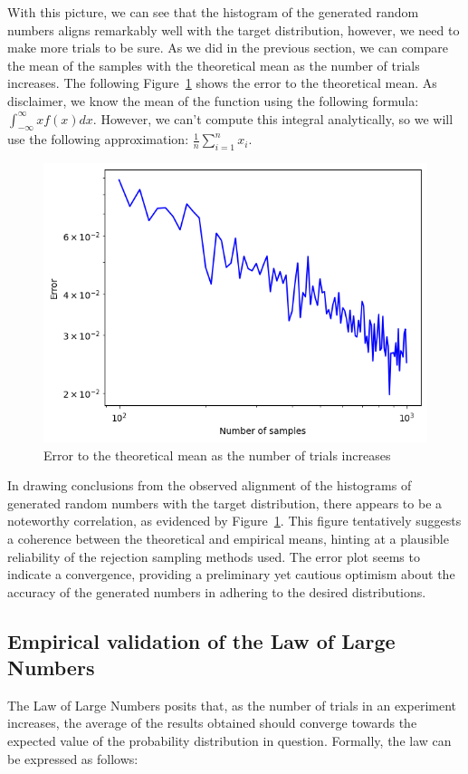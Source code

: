 \documentclass{article}
\begin{document}
With this picture, we can see that the histogram of the generated random numbers aligns remarkably well with the target distribution, however, we need to make more trials to be sure. As we did in the previous section, we can compare the mean of the samples with the theoretical mean as the number of trials increases. The following Figure~\ref{fig:rejectionerror} shows the error to the theoretical mean. As disclaimer, we know the mean of the function using the following formula: \(\int_{-\infty}^{\infty} xf(x)dx\). However, we can't compute this integral analytically, so we will use the following approximation: \(\frac{1}{n}\sum_{i=1}^{n} x_i\).

\begin{figure}[H]
	\centering
	\includegraphics[width=0.5\linewidth]{./Figures/AcceptanceRejection/error_linear_regression.png}
	\caption{Error to the theoretical mean as the number of trials increases}
	\label{fig:rejectionerror}
\end{figure}

In drawing conclusions from the observed alignment of the histograms of generated random numbers with the target distribution, there appears to be a noteworthy correlation, as evidenced by Figure~\ref{fig:rejectionerror}. This figure tentatively suggests a coherence between the theoretical and empirical means, hinting at a plausible reliability of the rejection sampling methods used. The error plot seems to indicate a convergence, providing a preliminary yet cautious optimism about the accuracy of the generated numbers in adhering to the desired distributions.

\subsection{Empirical validation of the Law of Large Numbers}

The Law of Large Numbers posits that, as the number of trials in an experiment increases, the average of the results obtained should converge towards the expected value of the probability distribution in question. Formally, the law can be expressed as follows:
\end{document}
